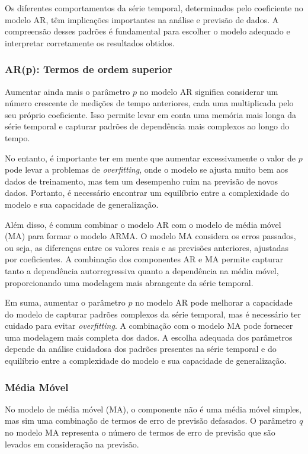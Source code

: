 Os diferentes comportamentos da série temporal, determinados pelo coeficiente no modelo AR, têm implicações importantes na análise e previsão de dados. A compreensão desses padrões é fundamental para escolher o modelo adequado e interpretar corretamente os resultados obtidos.

\subsubsection{AR(p): Termos de ordem superior}

Aumentar ainda mais o parâmetro $p$ no modelo AR significa considerar um número crescente de medições de tempo anteriores, cada uma multiplicada pelo seu próprio coeficiente. Isso permite levar em conta uma memória mais longa da série temporal e capturar padrões de dependência mais complexos ao longo do tempo.

No entanto, é importante ter em mente que aumentar excessivamente o valor de $p$ pode levar a problemas de \textit{overfitting}, onde o modelo se ajusta muito bem aos dados de treinamento, mas tem um desempenho ruim na previsão de novos dados. Portanto, é necessário encontrar um equilíbrio entre a complexidade do modelo e sua capacidade de generalização.

Além disso, é comum combinar o modelo AR com o modelo de média móvel (MA) para formar o modelo ARMA. O modelo MA considera os erros passados, ou seja, as diferenças entre os valores reais e as previsões anteriores, ajustadas por coeficientes. A combinação dos componentes AR e MA permite capturar tanto a dependência autorregressiva quanto a dependência na média móvel, proporcionando uma modelagem mais abrangente da série temporal.

Em suma, aumentar o parâmetro $p$ no modelo AR pode melhorar a capacidade do modelo de capturar padrões complexos da série temporal, mas é necessário ter cuidado para evitar \textit{overfitting}. A combinação com o modelo MA pode fornecer uma modelagem mais completa dos dados. A escolha adequada dos parâmetros depende da análise cuidadosa dos padrões presentes na série temporal e do equilíbrio entre a complexidade do modelo e sua capacidade de generalização.

\subsubsection{M\'edia M\'ovel}\label{subsubsec:ma}
No modelo de média móvel (MA), o componente não é uma média móvel simples, mas sim uma combinação de termos de erro de previsão defasados. O parâmetro $q$ no modelo MA representa o número de termos de erro de previsão que são levados em consideração na previsão.

